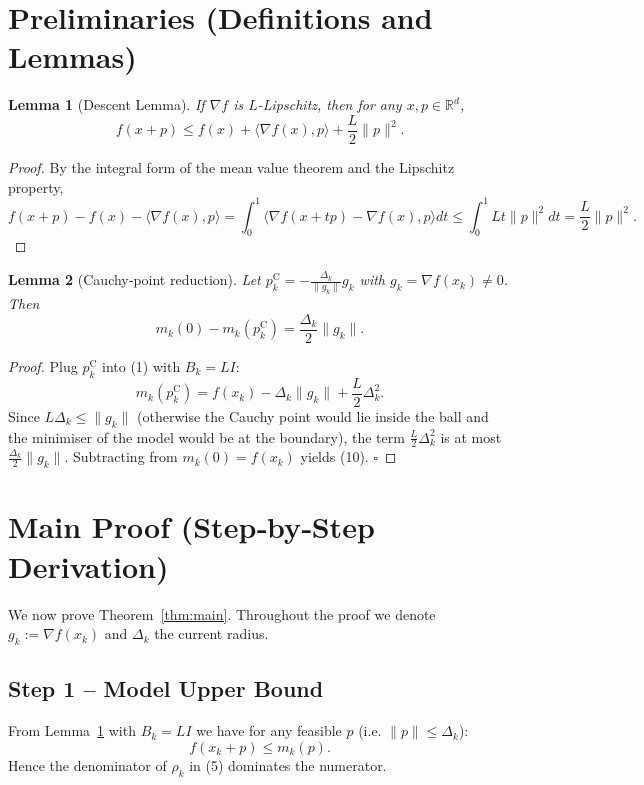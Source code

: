 \documentclass[11pt]{article}
\newtheorem{lemma}{Lemma}
\begin{document}
\section{Preliminaries (Definitions and Lemmas)}
\begin{lemma}[Descent Lemma]\label{lem:descent}
If \(\nabla f\) is \(L\)-Lipschitz, then for any \(x,p\in\mathbb{R}^d\),
\[
f(x+p)\le f(x)+\langle\nabla f(x),p\rangle +\frac{L}{2}\|p\|^2 .
\tag{9}
\]
\end{lemma}
\begin{proof}
By the integral form of the mean value theorem and the Lipschitz property,
\[
f(x+p)-f(x)-\langle\nabla f(x),p\rangle
= \int_{0}^{1}\!\langle\nabla f(x+tp)-\nabla f(x),p\rangle dt
\le \int_{0}^{1} L t\|p\|^2 dt =\frac{L}{2}\|p\|^2 .
\]
\end{proof}

\begin{lemma}[Cauchy‑point reduction]\label{lem:cauchy}
Let \(p^{\mathrm{C}}_k = -\frac{\Delta_k}{\|g_k\|}g_k\) with \(g_k=\nabla f(x_k)\neq0\). Then
\[
m_k(0)-m_k(p^{\mathrm{C}}_k) = \frac{\Delta_k}{2}\|g_k\|.
\tag{10}
\]
\end{lemma}
\begin{proof}
Plug \(p^{\mathrm{C}}_k\) into (1) with \(B_k=LI\):
\[
m_k(p^{\mathrm{C}}_k)=f(x_k)-\Delta_k\|g_k\|+\frac{L}{2}\Delta_k^{2}.
\]
Since \(L\Delta_k\le \|g_k\|\) (otherwise the Cauchy point would lie inside the ball and the minimiser of the model would be at the boundary), the term \(\frac{L}{2}\Delta_k^{2}\) is at most \(\frac{\Delta_k}{2}\|g_k\|\). Subtracting from \(m_k(0)=f(x_k)\) yields (10). \hfill\(\square\)
\end{proof}

\section{Main Proof (Step‑by‑Step Derivation)}
We now prove Theorem~\ref{thm:main}. Throughout the proof we denote \(g_k:=\nabla f(x_k)\) and \(\Delta_k\) the current radius.

\subsection*{Step 1 – Model Upper Bound}
From Lemma~\ref{lem:descent} with \(B_k=LI\) we have for any feasible \(p\) (i.e. \(\|p\|\le\Delta_k\)):
\[
f(x_k+p)\le m_k(p). \tag{11}
\]
Hence the denominator of \(\rho_k\) in (5) dominates the numerator.
\end{document}
